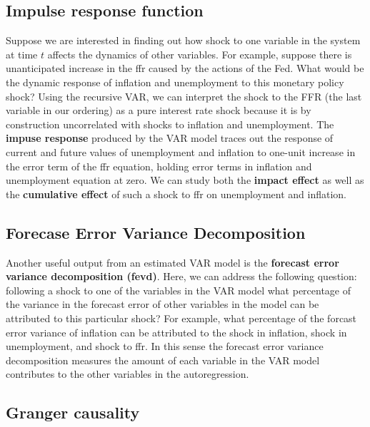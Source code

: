 \documentclass[]{book}
\theoremstyle{definition}
\theoremstyle{definition}
\theoremstyle{definition}
\theoremstyle{remark}
\begin{document}
\hypertarget{impulse-response-function}{%
\subsection{Impulse response function}\label{impulse-response-function}}

Suppose we are interested in finding out how shock to one variable in the system at time \(t\) affects the dynamics of other variables. For example, suppose there is unanticipated increase in the ffr caused by the actions of the Fed. What would be the dynamic response of inflation and unemployment to this monetary policy shock? Using the recursive VAR, we can interpret the shock to the FFR (the last variable in our ordering) as a pure interest rate shock because it is by construction uncorrelated with shocks to inflation and unemployment. The \textbf{impuse response} produced by the VAR model traces out the response of current and future values of unemployment and inflation to one-unit increase in the error term of the ffr equation, holding error terms in inflation and unemployment equation at zero. We can study both the \textbf{impact effect} as well as the \textbf{cumulative effect} of such a shock to ffr on unemployment and inflation.

\hypertarget{forecase-error-variance-decomposition}{%
\subsection{Forecase Error Variance Decomposition}\label{forecase-error-variance-decomposition}}

Another useful output from an estimated VAR model is the \textbf{forecast error variance decomposition (fevd)}. Here, we can address the following question: following a shock to one of the variables in the VAR model what percentage of the variance in the forecast error of other variables in the model can be attributed to this particular shock? For example, what percentage of the forcast error variance of inflation can be attributed to the shock in inflation, shock in unemployment, and shock to ffr. In this sense the forecast error variance decomposition measures the amount of each variable in the VAR model contributes to the other variables in the autoregression.

\hypertarget{granger-causality}{%
\subsection{Granger causality}\label{granger-causality}}
\end{document}
